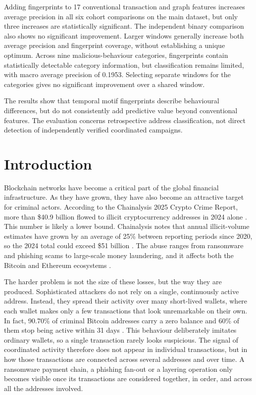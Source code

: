 \documentclass{thesisclass}
\begin{document}
Adding fingerprints to 17 conventional transaction and graph features increases
average precision in all six cohort comparisons on the main dataset, but only
three increases are statistically significant. The independent binary comparison
also shows no significant improvement. Larger windows generally increase both
average precision and fingerprint coverage, without establishing a unique
optimum. Across nine malicious-behaviour categories, fingerprints contain
statistically detectable category information, but classification remains
limited, with macro average precision of 0.1953. Selecting separate windows for
the categories gives no significant improvement over a shared window.

The results show that temporal motif fingerprints describe behavioural
differences, but do not consistently add predictive value beyond conventional
features. The evaluation concerns retrospective address classification, not
direct detection of independently verified coordinated campaigns.


\chapter{Introduction}
\label{ch:introduction}
Blockchain networks have become a critical part of the global financial infrastructure. As they have grown, they have also become an attractive target for criminal actors. According to the Chainalysis 2025 Crypto Crime Report, more than \$40.9 billion flowed to illicit cryptocurrency addresses in 2024 alone \citep{chainalysis2025, shi2025realcats}. This number is likely a lower bound. Chainalysis notes that annual illicit-volume estimates have grown by an average of 25\% between reporting periods since 2020, so the 2024 total could exceed \$51 billion \citep{chainalysis2025}. The abuse ranges from ransomware and phishing scams to large-scale money laundering, and it affects both the Bitcoin and Ethereum ecosystems \citep{shi2025realcats, sanjalawe2023atd}.

The harder problem is not the size of these losses, but the way they are produced. Sophisticated attackers do not rely on a single, continuously active address. Instead, they spread their activity over many short-lived wallets, where each wallet makes only a few transactions that look unremarkable on their own. In fact, 90.70\% of criminal Bitcoin addresses carry a zero balance and 60\% of them stop being active within 31 days \citep{shi2025realcats}. This behaviour deliberately imitates ordinary wallets, so a single transaction rarely looks suspicious. The signal of coordinated activity therefore does not appear in individual transactions, but in how those transactions are connected across several addresses and over time. A ransomware payment chain, a phishing fan-out or a layering operation only becomes visible once its transactions are considered together, in order, and across all the addresses involved.
\end{document}
